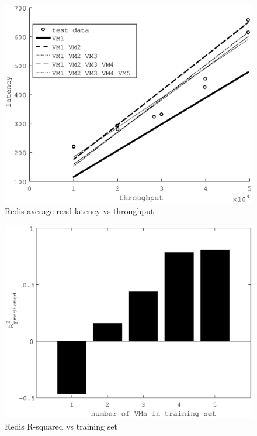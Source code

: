 \documentclass{acm_proc_article-sp}
\begin{document}
\begin{figure}
\centering
\includegraphics[scale = 0.5]{fit_read_avg_latency_r3_2x_r3__m3_2x_m3__r3_x_m3_x.eps}
\caption{Redis average read latency vs throughput}
\label{figure:redisbarread}
\end{figure}


\begin{figure}
\centering
\includegraphics[scale = 0.5]{bar_read_avg_latency_r3_x_r3_2x_m3_x_r3__m3_2x_m3_.eps}
\caption{Redis R-squared vs training set}
\label{figure:redisbarread}
\end{figure}
\end{document}

